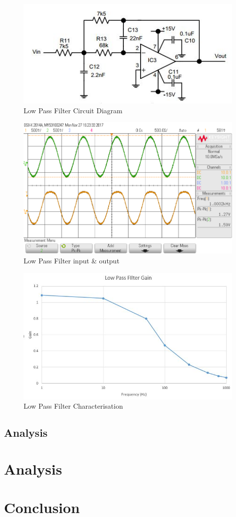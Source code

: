 \documentclass[10pt,a4paper]{article}
\begin{document}
\begin{figure}
\includegraphics[width=\textwidth]{LPF}
\caption{Low Pass Filter Circuit Diagram}
\label{LPF}
\end{figure}

\begin{figure}[!h]
\includegraphics[width =\textwidth]{lpfilter}
\caption{Low Pass Filter input \& output}
\label{LPFscope}
\end{figure}

\begin{figure}[!h]
\includegraphics[width = \textwidth]{LPFchar}
\caption{Low Pass Filter Characterisation}
\label{LPFchar}
\end{figure}

\subsection{Analysis}

\section{Analysis}

\section{Conclusion}

\printbibliography
\end{document}
